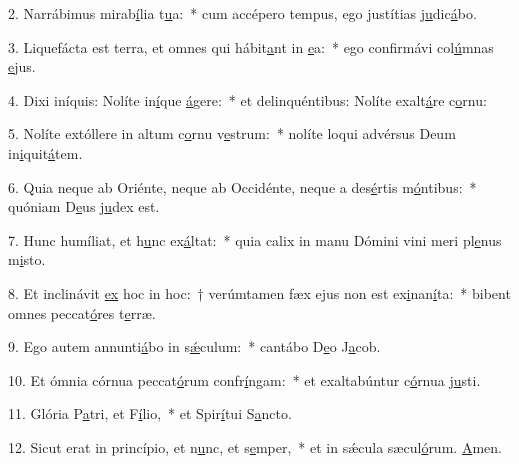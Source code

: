 2. Narrábimus mirab\uline{í}lia t\uline{u}a:~* cum accépero tempus, ego justítias j\uline{u}dic\uline{á}bo.\par 
3. Liquefácta est terra, et omnes qui hábit\uline{a}nt in \uline{e}a:~* ego confirmávi col\uline{ú}mnas \uline{e}jus.\par 
4. Dixi iníquis: Nolíte in\uline{í}que \uline{á}gere:~* et delinquéntibus: Nolíte exalt\uline{á}re c\uline{o}rnu:\par 
5. Nolíte extóllere in altum c\uline{o}rnu v\uline{e}strum:~* nolíte loqui advérsus Deum in\uline{i}quit\uline{á}tem.\par 
6. Quia neque ab Oriénte, neque ab Occidénte, neque a des\uline{é}rtis m\uline{ó}ntibus:~* quóniam D\uline{e}us j\uline{u}dex est.\par 
7. Hunc humíliat, et h\uline{u}nc ex\uline{á}ltat:~* quia calix in manu Dómini vini meri pl\uline{e}nus m\uline{i}sto.\par 
8. Et inclinávit \uline{ex} hoc in hoc:~† verúmtamen fæx ejus non est ex\uline{i}nan\uline{í}ta:~* bibent omnes peccat\uline{ó}res t\uline{e}rræ.\par 
9. Ego autem annunti\uline{á}bo in s\uline{ǽ}culum:~* cantábo D\uline{e}o J\uline{a}cob.\par 
10. Et ómnia córnua peccat\uline{ó}rum confr\uline{í}ngam:~* et exaltabúntur c\uline{ó}rnua j\uline{u}sti.\par 
11. Glória P\uline{a}tri, et F\uline{í}lio,~* et Spir\uline{í}tui S\uline{a}ncto.\par 
12. Sicut erat in princípio, et n\uline{u}nc, et s\uline{e}mper,~* et in sǽcula sæcul\uline{ó}rum. \uline{A}men.\par 
